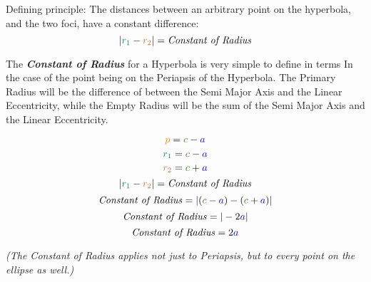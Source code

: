 \begin{center}
\end{center}
Defining principle: The distances between an arbitrary point on the hyperbola, and the two foci, have a constant difference:
$$|\textcolor{teal}{r_1} - \textcolor{brown}{r_2}| = \text{\textit{Constant of Radius}}$$
\newpage

The \textbf{\textit{Constant of Radius}} for a Hyperbola is very simple to define in terms In the case of the point being on the Periapsis of the Hyperbola. The Primary Radius will be the difference of between the Semi Major Axis and the Linear Eccentricity, while the Empty Radius will be the sum of the Semi Major Axis and the Linear Eccentricity.

\bigskip
\begin{minipage}{\textwidth}
$$\textcolor{orange}{p} = \textcolor{OliveGreen}{c} - \textcolor{blue}{a}$$
$$\textcolor{teal}{r_1} = \textcolor{OliveGreen}{c} - \textcolor{blue}{a}$$
$$\textcolor{brown}{r_2} = \textcolor{OliveGreen}{c}+\textcolor{blue}{a}$$
$$|\textcolor{teal}{r_1} - \textcolor{brown}{r_2}| = \text{\textit{Constant of Radius}}$$
$$\text{\textit{Constant of Radius}} = |(\textcolor{OliveGreen}{c} - \textcolor{blue}{a}) - (\textcolor{OliveGreen}{c}+\textcolor{blue}{a})|$$
$$\text{\textit{Constant of Radius}} =|-2\textcolor{blue}{a}|$$
$$\text{\textit{Constant of Radius}} = 2\textcolor{blue}{a}$$
\begin{center}
\scriptsize{\textit{(The Constant of Radius applies not just to Periapsis, but to every point on the ellipse as well.)}}
\end{center}
\normalsize
\end{minipage}
\bigskip

